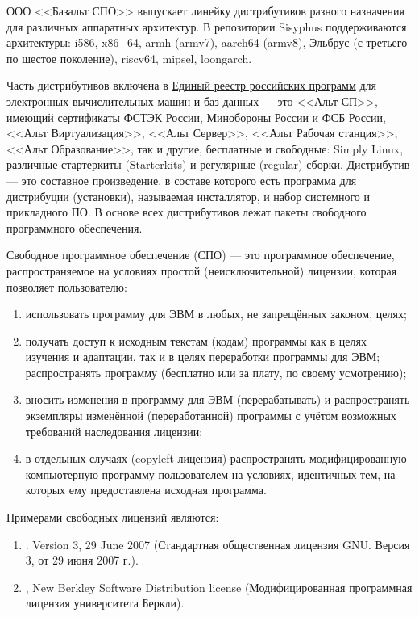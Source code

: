 ООО <<Базальт СПО>> выпускает линейку дистрибутивов разного назначения для различных аппаратных архитектур.
В репозитории Sisyphus поддерживаются архитектуры: i586, x86\_64, armh (armv7), aarch64 (armv8), 
Эльбрус (с третьего по шестое поколение), riscv64, mipsel, loongarch.

Часть дистрибутивов включена в \href{reestr.digital.gov.ru}{Единый реестр российских программ} для электронных 
вычислительных машин и баз данных --- это <<Альт СП>>, имеющий сертификаты ФСТЭК России, 
Минобороны России и ФСБ России, <<Альт Виртуализация>>, <<Альт Сервер>>, <<Альт Рабочая станция>>, 
<<Альт Образование>>, так и другие, бесплатные и свободные: Simply Linux, различные стартеркиты 
(Starterkits) и регулярные (regular) сборки. Дистрибутив --- это составное произведение, 
в составе которого есть программа для дистрибуции (установки), называемая инсталлятор, и 
набор системного и прикладного ПО. В основе всех дистрибутивов лежат пакеты свободного 
программного обеспечения.

Свободное программное обеспечение (СПО) --- это программное обеспечение, распространяемое 
на условиях простой (неисключительной) лицензии, которая позволяет пользователю:
\begin{enumerate}
	\item использовать программу для ЭВМ в любых, не запрещённых законом, целях;
	\item получать доступ к исходным текстам (кодам) программы как в целях изучения и адаптации, 
	так и в целях переработки программы для ЭВМ; распространять программу (бесплатно или за плату, по своему усмотрению);
	\item вносить изменения в программу для ЭВМ (перерабатывать) и распространять экземпляры изменённой (переработанной) 
	программы с учётом возможных требований наследования лицензии;
	\item в отдельных случаях (copyleft лицензия) распространять модифицированную компьютерную программу пользователем 
	на условиях, идентичных тем, на которых ему предоставлена исходная программа.
\end{enumerate}

Примерами свободных лицензий являются:
\begin{enumerate}
	\item \href{https://www.gnu.org/licenses/gpl-3.0.html}{}. Version 3, 29 June 2007 (Стандартная общественная лицензия GNU. Версия 3, от 29 июня 2007 г.).
	\item \href{https://en.wikipedia.org/wiki/BSD_licenses}{}, New Berkley Software Distribution license (Модифицированная программная лицензия университета Беркли).
\end{enumerate}


